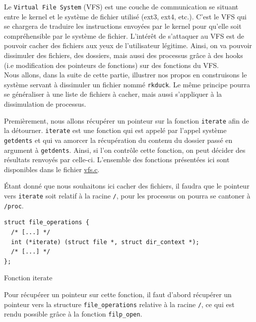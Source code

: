 \documentclass[12pt]{article}
\begin{document}
        Le \texttt{Virtual File System} (VFS) est une couche de communication se situant entre le kernel et le système de fichier utilisé (ext3, ext4, etc.). C'est le VFS qui se chargera de traduire les instructions envoyées par le kernel pour qu'elle soit compréhensible par le système de fichier.
        L'intérêt de s'attaquer au VFS est de pouvoir cacher des fichiers aux yeux de l'utilisateur légitime. Ainsi, on va pouvoir dissimuler des fichiers, des dossiers, mais aussi des processus grâce à des hooks (i.e modification des pointeurs de fonctions) sur des fonctions du VFS. \\

        Nous allons, dans la suite de cette partie, illustrer nos propos en construisons le système servant à dissimuler un fichier nommé \texttt{rkduck}. Le même principe pourra se généraliser à une liste de fichiers à cacher, mais aussi s'appliquer à la dissimulation de processus. 

        Premièrement, nous allons récupérer un pointeur sur la fonction \texttt{iterate} afin de la détourner. \texttt{iterate} est une fonction qui est appelé par l'appel système \texttt{getdents} et qui va amorcer la récupération du contenu du dossier passé en argument à \texttt{getdents}. Ainsi, si l'on contrôle cette fonction, on peut décider des résultats renvoyés par celle-ci. L'ensemble des fonctions présentées ici sont disponibles dans le fichier \href{https://github.com/QuokkaLight/rkduck/blob/master/rkduck/vfs.c}{vfs.c}.

        Étant donné que nous souhaitons ici cacher des fichiers, il faudra que le pointeur vers \texttt{iterate} soit relatif à la racine \texttt{/}, pour les processus on pourra se cantoner à \texttt{/proc}. \\

\begin{listing}[H]
\begin{verbatim}
struct file_operations {
  /* [...] */
  int (*iterate) (struct file *, struct dir_context *);
  /* [...] */
};
\end{verbatim}
\caption{Fonction iterate}
\label{listing:3}
\end{listing}

        Pour récupérer un pointeur sur cette fonction, il faut d'abord récupérer un pointeur vers la structure \texttt{file\_operations} relative à la racine \texttt{/}, ce qui est rendu possible grâce à la fonction \texttt{filp\_open}.\\
\end{document}
